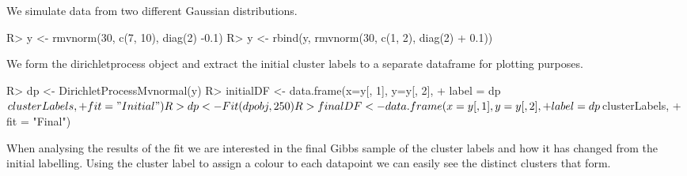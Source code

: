 \documentclass[nojss]{jss}
\begin{document}
We simulate data from two different Gaussian distributions.
\begin{Schunk}
\begin{Sinput}
R> y <- rmvnorm(30, c(7, 10), diag(2)  -0.1)
R> y <- rbind(y, rmvnorm(30, c(1, 2), diag(2) + 0.1))
\end{Sinput}
\end{Schunk}
We form the dirichletprocess object and extract the initial cluster labels to a separate dataframe for plotting purposes.
\begin{Schunk}
\begin{Sinput}
R> dp <- DirichletProcessMvnormal(y)
R> initialDF <- data.frame(x=y[, 1], y=y[, 2],
+                          label = dp$clusterLabels,
+                          fit = "Initial")
R> dp <- Fit(dpobj, 250)
R> finalDF <- data.frame(x=y[, 1], y=y[, 2],
+                        label = dp$clusterLabels,
+                        fit = "Final")
\end{Sinput}
\end{Schunk}
When analysing the results of the fit we are interested in the final Gibbs sample of the cluster labels and how it has changed from the initial labelling. Using the cluster label to assign a colour to each datapoint we can easily see the distinct clusters that form.
\end{document}
